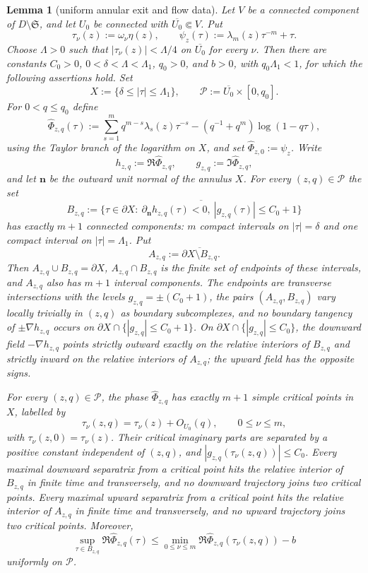 \documentclass[10pt,a4paper]{amsart}
\newtheorem{lem}{Lemma}
\begin{document}
\begin{lem}[uniform annular exit and flow data]\label{lem:wright-exit-arcs}
Let $V$ be a connected component of $D\setminus\mathfrak S$, and let $U_0$ be connected with $\overline{U_0}\Subset V$. Put
$$\tau_\nu(z):=\omega_\nu\eta(z),\qquad \psi_z(\tau):=\lambda_m(z)\tau^{-m}+\tau.$$
Choose $\Lambda>0$ such that $|\tau_\nu(z)|<\Lambda/4$ on $\overline{U_0}$ for every $\nu$. Then there are constants $C_0>0$, $0<\delta<\Lambda<\Lambda_1$, $q_0>0$, and $b>0$, with $q_0\Lambda_1<1$, for which the following assertions hold. Set
$$X:=\{\delta\le |\tau|\le\Lambda_1\},\qquad \mathcal P:=\overline{U_0}\times[0,q_0].$$
For $0<q\le q_0$ define
$$\widehat\Phi_{z,q}(\tau):=\sum_{s=1}^m q^{m-s}\lambda_s(z)\tau^{-s}-(q^{-1}+q^m)\log(1-q\tau),$$
using the Taylor branch of the logarithm on $X$, and set $\widehat\Phi_{z,0}:=\psi_z$. Write
$$h_{z,q}:=\Re\widehat\Phi_{z,q},\qquad g_{z,q}:=\Im\widehat\Phi_{z,q},$$
and let $\mathbf n$ be the outward unit normal of the annulus $X$. For every $(z,q)\in\mathcal P$ the set
$$
B_{z,q}:=\overline{\{\tau\in\partial X:\ \partial_{\mathbf n}h_{z,q}(\tau)<0,\ |g_{z,q}(\tau)|\le C_0+1\}}
$$
has exactly $m+1$ connected components: $m$ compact intervals on $|\tau|=\delta$ and one compact interval on $|\tau|=\Lambda_1$. Put
$$A_{z,q}:=\overline{\partial X\setminus B_{z,q}}.$$
Then $A_{z,q}\cup B_{z,q}=\partial X$, $A_{z,q}\cap B_{z,q}$ is the finite set of endpoints of these intervals, and $A_{z,q}$ also has $m+1$ interval components. The endpoints are transverse intersections with the levels $g_{z,q}=\pm(C_0+1)$, the pairs $(A_{z,q},B_{z,q})$ vary locally trivially in $(z,q)$ as boundary subcomplexes, and no boundary tangency of $\pm\nabla h_{z,q}$ occurs on $\partial X\cap\{|g_{z,q}|\le C_0+1\}$. On $\partial X\cap\{|g_{z,q}|\le C_0\}$, the downward field $-\nabla h_{z,q}$ points strictly outward exactly on the relative interiors of $B_{z,q}$ and strictly inward on the relative interiors of $A_{z,q}$; the upward field has the opposite signs.

For every $(z,q)\in\mathcal P$, the phase $\widehat\Phi_{z,q}$ has exactly $m+1$ simple critical points in $X$, labelled by
$$\tau_\nu(z,q)=\tau_\nu(z)+O_{U_0}(q),\qquad 0\le\nu\le m,$$
with $\tau_\nu(z,0)=\tau_\nu(z)$. Their critical imaginary parts are separated by a positive constant independent of $(z,q)$, and $|g_{z,q}(\tau_\nu(z,q))|\le C_0$. Every maximal downward separatrix from a critical point hits the relative interior of $B_{z,q}$ in finite time and transversely, and no downward trajectory joins two critical points. Every maximal upward separatrix from a critical point hits the relative interior of $A_{z,q}$ in finite time and transversely, and no upward trajectory joins two critical points. Moreover,
$$\sup_{\tau\in B_{z,q}}\Re\widehat\Phi_{z,q}(\tau)
\le \min_{0\le\nu\le m}\Re\widehat\Phi_{z,q}(\tau_\nu(z,q))-b$$
uniformly on $\mathcal P$.
\end{lem}
\end{document}
